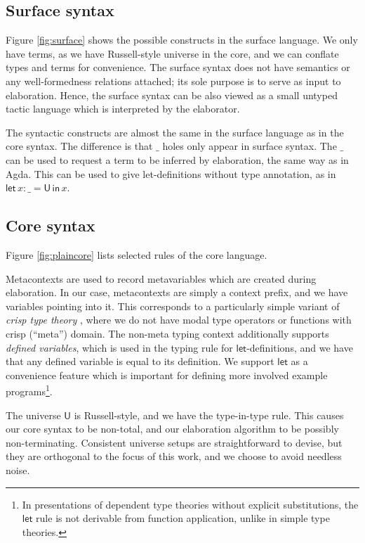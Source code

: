 \documentclass[acmsmall,review,anonymous,prologue,dvipsnames]{acmart}\settopmatter{printfolios=true,printccs=false,printacmref=false}
\newcommand{\slet}{\boldsymbol{\mathsf{let}}}
\renewcommand{\sin}{\boldsymbol{\mathsf{in}}}
\renewcommand{\U}{\mathsf{U}}
\theoremstyle{remark}
\begin{document}
\subsection{Surface syntax}
Figure \ref{fig:surface} shows the possible constructs in the surface
language. We only have terms, as we have Russell-style universe in the core, and
we can conflate types and terms for convenience. The surface syntax does not
have semantics or any well-formedness relations attached; its sole purpose is to
serve as input to elaboration. Hence, the surface syntax can be also viewed as a
small untyped tactic language which is interpreted by the elaborator.

The syntactic constructs are almost the same in the surface language as in
the core syntax. The difference is that $\_$ holes only appear in surface
syntax. The $\_$ can be used to request a term to be inferred by elaboration,
the same way as in Agda.  This can be used to give let-definitions without type
annotation, as in $\slet\,x : \_ = \U\,\sin\,x$.

\subsection{Core syntax}
\label{sec:core}

Figure \ref{fig:plaincore} lists selected rules of the core language.

Metacontexts are used to record metavariables which are created during
elaboration. In our case, metacontexts are simply a context prefix, and we have
variables pointing into it. This corresponds to a particularly simple variant of
\emph{crisp type theory} \cite{licata2018internal}, where we do not have modal
type operators or functions with crisp (``meta'') domain. The non-meta typing
context additionally supports \emph{defined variables}, which is used in the
typing rule for $\slet$-definitions, and we have that any defined variable is
equal to its definition. We support $\slet$ as a convenience feature which is
important for defining more involved example programs\footnote{In presentations
  of dependent type theories without explicit substitutions, the $\slet$ rule is
  not derivable from function application, unlike in simple type theories.}.

The universe $\U$ is Russell-style, and we have the type-in-type rule.  This
causes our core syntax to be non-total, and our elaboration algorithm to be
possibly non-terminating. Consistent universe setups are straightforward to
devise, but they are orthogonal to the focus of this work, and we choose to
avoid needless noise.
\end{document}
